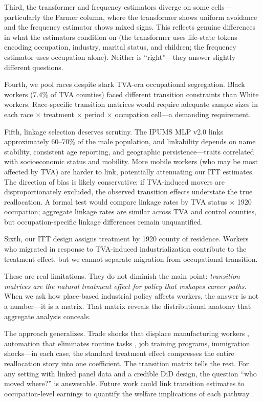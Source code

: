 \documentclass[12pt]{article}
\begin{document}
Third, the transformer and frequency estimators diverge on some cells---particularly the Farmer column, where the transformer shows uniform avoidance and the frequency estimator shows mixed signs. This reflects genuine differences in what the estimators condition on (the transformer uses life-state tokens encoding occupation, industry, marital status, and children; the frequency estimator uses occupation alone). Neither is ``right''---they answer slightly different questions.

Fourth, we pool races despite stark TVA-era occupational segregation. Black workers (7.4\% of TVA counties) faced different transition constraints than White workers. Race-specific transition matrices would require adequate sample sizes in each race $\times$ treatment $\times$ period $\times$ occupation cell---a demanding requirement.

Fifth, linkage selection deserves scrutiny. The IPUMS MLP v2.0 links approximately 60--70\% of the male population, and linkability depends on name stability, consistent age reporting, and geographic persistence---traits correlated with socioeconomic status and mobility. More mobile workers (who may be most affected by TVA) are harder to link, potentially attenuating our ITT estimates. The direction of bias is likely conservative: if TVA-induced movers are disproportionately excluded, the observed transition effects understate the true reallocation. A formal test would compare linkage rates by TVA status $\times$ 1920 occupation; aggregate linkage rates are similar across TVA and control counties, but occupation-specific linkage differences remain unquantified.

Sixth, our ITT design assigns treatment by 1920 county of residence. Workers who migrated in response to TVA-induced industrialization contribute to the treatment effect, but we cannot separate migration from occupational transition.

These are real limitations. They do not diminish the main point: \textit{transition matrices are the natural treatment effect for policy that reshapes career paths}. When we ask how place-based industrial policy affects workers, the answer is not a number---it is a matrix. That matrix reveals the distributional anatomy that aggregate analysis conceals.

The approach generalizes. Trade shocks that displace manufacturing workers \citep{autor2013}, automation that eliminates routine tasks \citep{autor2003, deming2020}, job training programs, immigration shocks---in each case, the standard treatment effect compresses the entire reallocation story into one coefficient. The transition matrix tells the rest. For any setting with linked panel data and a credible DiD design, the question ``who moved where?'' is answerable. Future work could link transition estimates to occupation-level earnings to quantify the welfare implications of each pathway \citep{hsieh2019}.
\end{document}
